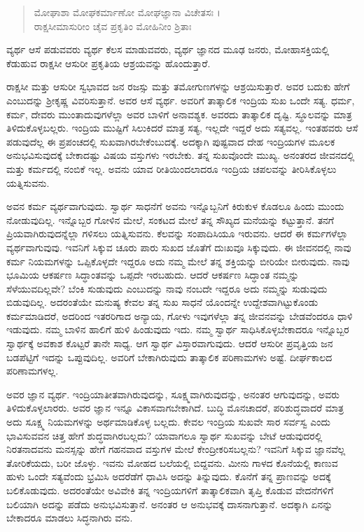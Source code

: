 \begin{verse}
ಮೋಘಾಶಾ ಮೋಘಕರ್ಮಾಣೋ ಮೋಘಜ್ಞಾನಾ ವಿಚೇತಸಃ ।\\ರಾಕ್ಷಸೀಮಾಸುರೀಂ ಚೈವ ಪ್ರಕೃತಿಂ ಮೋಹಿನೀಂ ಶ್ರಿತಾಃ 
\end{verse}

{\small ವ್ಯರ್ಥ ಆಸೆ ಪಡುವವರು ವ್ಯರ್ಥ ಕೆಲಸ ಮಾಡುವವರು, ವ್ಯರ್ಥ ಜ್ಞಾನದ ಮೂಢ ಜನರು, ಮೋಹಾಸಕ್ತಿಯಲ್ಲಿ ಕೆಡುಹುವ ರಾಕ್ಷಸೀ ಆಸುರೀ ಪ್ರಕೃತಿಯ ಆಶ್ರಯವನ್ನು ಹೊಂದುತ್ತಾರೆ.}

ರಾಕ್ಷಸೀ ಮತ್ತು ಆಸುರೀ ಸ್ವಭಾವದ ಜನ ರಜಸ್ಸು ಮತ್ತು ತಮೋಗುಣಗಳನ್ನು ಆಶ್ರಯಿಸುತ್ತಾರೆ. ಅವರ ಬದುಕು ಹೇಗೆ ಎಂಬುದನ್ನು ಶ್ರೀಕೃಷ್ಣ ವಿವರಿಸುತ್ತಾನೆ. ಅವರ ಆಸೆ ವ್ಯರ್ಥ. ಅವರಿಗೆ ತಾತ್ಕಾಲಿಕ ಇಂದ್ರಿಯ ಸುಖ ಒಂದೇ ಸತ್ಯ. ಧರ್ಮ, ಕರ್ಮ, ದೇವರು ಮುಂತಾದುವುಗಳೆಲ್ಲಾ ಅವರ ಬಾಳಿಗೆ ಅನಾವಶ್ಯಕ. ಅವರದು ತಾತ್ಕಾಲಿಕ ದೃಷ್ಟಿ. ಸ್ಥೂಲವನ್ನು ಮಾತ್ರ ತಿಳಿದುಕೊಳ್ಳಬಲ್ಲರು. ಇಂದ್ರಿಯ ಮುಷ್ಟಿಗೆ ಸಿಲುಕಿದರೆ ಮಾತ್ರ ಸತ್ಯ, ಇಲ್ಲದೇ ಇದ್ದರೆ ಅದು ಸತ್ಯವಲ್ಲ. ಇಂತಹವರು ಆಸೆ ಪಡುವುದೆಲ್ಲ ಈ ಪ್ರಪಂಚದಲ್ಲಿ ಸುಖವಾಗಿರಬೇಕೆಂಬುದಕ್ಕೆ. ಅದಕ್ಕಾಗಿ ಪುಷ್ಟವಾದ ದೇಹ ಇಂದ್ರಿಯಗಳ ಮೂಲಕ ಅನುಭವಿಸುವುದಕ್ಕೆ ಬೇಕಾದಷ್ಟು ವಿಷಯ ವಸ್ತುಗಳು ಇರಬೇಕು. ತನ್ನ ಸುಖವೊಂದೇ ಮುಖ್ಯ. ಅನಂತರದ ಜೀವನದಲ್ಲಿ ಮತ್ತು ಕರ್ಮದಲ್ಲಿ ನಂಬಿಕೆ ಇಲ್ಲ. ಅವನು ಯಾವ ರೀತಿಯಿಂದಲಾದರೂ ಇಂದ್ರಿಯ ಚಪಲವನ್ನು ತೀರಿಸಿಕೊಳ್ಳಲು ಯತ್ನಿಸುವನು.

ಅವನ ಕರ್ಮ ವ್ಯರ್ಥವಾಗುವುದು. ಸ್ವಾರ್ಥ ಸಾಧನೆಗೆ ಅವನು ಇನ್ನೊಬ್ಬನಿಗೆ ಕಿರುಕುಳ ಕೊಡಲೂ ಹಿಂದು ಮುಂದು ನೋಡುವುದಿಲ್ಲ. ಇನ್ನೊಬ್ಬರ ಗೋಳಿನ ಮೇಲೆ, ಸಂಕಟದ ಮೇಲೆ ತನ್ನ ಸೌಖ್ಯದ ಮನೆಯನ್ನು ಕಟ್ಟುತ್ತಾನೆ. ತನಗೆ ಪ್ರಿಯವಾಗಿರುವುದನ್ನೆಲ್ಲಾ ಗಳಿಸಲು ಯತ್ನಿಸುವನು. ಕೆಲವನ್ನು ಸಂಪಾದಿಸಿಯೂ ಇರುವನು. ಆದರೆ ಈ ಕರ್ಮಗಳೆಲ್ಲಾ ವ್ಯರ್ಥವಾಗುವುವು. ಇವನಿಗೆ ಸಿಕ್ಕುವ ಚೂರು ಪಾರು ಸುಖದ ಜೊತೆಗೆ ದುಃಖವೂ ಸಿಕ್ಕುವುದು. ಈ ಜೀವನದಲ್ಲಿ ನಾವು ಕರ್ಮ ನಿಯಮಗಳನ್ನು ಒಪ್ಪಿಕೊಳ್ಳದೇ ಇದ್ದರೂ ಅದು ನಮ್ಮ ಮೇಲೆ ತನ್ನ ಶಕ್ತಿಯನ್ನು ಬೀರಿಯೇ ಬೀರುವುದು. ನಾವು ಭೂಮಿಯ ಆಕರ್ಷಣ ಸಿದ್ಧಾಂತವನ್ನು ಒಪ್ಪದೇ ಇರಬಹುದು. ಆದರೆ ಆಕರ್ಷಣ ಸಿದ್ಧಾಂತ ನಮ್ಮನ್ನು ಸೆಳೆಯುವದಿಲ್ಲವೇ? ಬೆಂಕಿ ಸುಡುವುದು ಎಂಬುದನ್ನು ನಾವು ನಂಬದೇ ಇದ್ದರೂ ಅದು ನಮ್ಮನ್ನು ಸುಡುವುದು ಬಿಡುವುದಿಲ್ಲ. ಅದರಂತೆಯೇ ಮನುಷ್ಯ ಕೇವಲ ತನ್ನ ಸುಖ ಸಾಧನೆ ಯೊಂದನ್ನೇ ಉದ್ದೇಶವಾಗಿಟ್ಟುಕೊಂಡು ಕರ್ಮಮಾಡಿದರೆ, ಅದರಿಂದ ಇತರರಿಗಾದ ಅನ್ಯಾಯ, ಗೋಳು ಇವುಗಳೆಲ್ಲಾ ತನ್ನ ಜೀವನವನ್ನು ಬೇಡವೆಂದರೂ ಧಾಳಿ ಇಡುವುದು. ನಮ್ಮ ಬಾಳಿನ ಹಾಲಿಗೆ ಹುಳಿ ಹಿಂಡುವುದು ಇದು. ನಮ್ಮ ಸ್ವಾರ್ಥ ಸಾಧಿಸಿಕೊಳ್ಳಬೇಕಾದರೂ ಇನ್ನೊಬ್ಬರ ಸ್ವಾರ್ಥಕ್ಕೆ ಅವಕಾಶ ಕೊಟ್ಟರೆ ತಾನೇ ಸಾಧ್ಯ. ಆಗ ಸ್ವಾರ್ಥ ವಿಸ್ತಾರವಾಗುವುದು. ಆದರೆ ಆಸುರೀ ಪ್ರವೃತ್ತಿಯ ಜನ ಬಡಪೆಟ್ಟಿಗೆ ಇದನ್ನು ಒಪ್ಪುವುದಿಲ್ಲ. ಅವರಿಗೆ ಬೇಕಾಗಿರುವುದು ತಾತ್ಕಾಲಿಕ ಪರಿಣಾಮಗಳು ಅಷ್ಟೆ. ದೀರ್ಘಕಾಲದ ಪರಿಣಾಮಗಳಲ್ಲ.

ಅವರ ಜ್ಞಾನ ವ್ಯರ್ಥ. ಇಂದ್ರಿಯಾತೀತವಾಗಿರುವುದನ್ನು, ಸೂಕ್ಷ್ಮವಾಗಿರುವುದನ್ನು, ಅನಂತರ ಆಗುವುದನ್ನು, ಅವರು ತಿಳಿದುಕೊಳ್ಳಲಾರರು. ಅವರ ಜ್ಞಾನ ಇನ್ನೂ ವಿಕಾಸವಾಗಬೇಕಾಗಿದೆ. ಬುದ್ಧಿ ಮೊನಚಾದರೆ, ಪರಿಶುದ್ಧವಾದರೆ ಮಾತ್ರ ಅದು ಸೂಕ್ಷ್ಮ ನಿಯಮಗಳನ್ನು ಅರ್ಥಮಾಡಿಕೊಳ್ಳ ಬಲ್ಲದು. ಕೇವಲ ಇಂದ್ರಿಯ ಸುಖವೇ ಸಾರ ಸರ್ವಸ್ವ ಎಂದು ಭಾವಿಸುವವನ ಚಿತ್ತ ಹೇಗೆ ಶುದ್ಧವಾಗಿರಬಲ್ಲದು? ಯಾವಾಗಲೂ ಸ್ವಾರ್ಥ ಸುಖವನ್ನು ಬೇಟೆ ಆಡುವುದರಲ್ಲಿ ನಿರತನಾದವನು ಮನಸ್ಸನ್ನು ಹೇಗೆ ಗಹನವಾದ ವಸ್ತುಗಳ ಮೇಲೆ ಕೇಂದ್ರೀಕರಿಸಬಲ್ಲನು? ಇವನಿಗೆ ಸಿಕ್ಕುವ ಜ್ಞಾನವೆಲ್ಲ ತೋರಿಕೆಯದು, ಬರೀ ಜೊಳ್ಳು. ಇವನು ಮೋಹದ ಬಲೆಯಲ್ಲಿ ಬಿದ್ದವನು. ಮೀನು ಗಾಳದ ಕೊನೆಯಲ್ಲಿ ಕಾಣುವ ಹುಳು ಒಂದೇ ಸತ್ಯವೆಂದು ಭ್ರಮಿಸಿ ಅದರೆಡೆಗೆ ಧಾವಿಸಿ ಅದನ್ನು ತಿನ್ನುವುದು. ಕೊನೆಗೆ ತನ್ನ ಪ್ರಾಣವನ್ನು ಅದಕ್ಕೆ ಬಲಿಕೊಡುವುದು. ಅದರಂತೆಯೇ ಅವಿವೇಕಿ ತನ್ನ ಇಂದ್ರಿಯಗಳಿಗೆ ತಾತ್ಕಾಲಿಕವಾಗಿ ತೃಪ್ತಿ ಕೊಡುವ ವೇದನೆಗಳಿಗೆ ಬಲಿಯಾಗಿ ಅದನ್ನು ಪಡೆದು ಅನುಭವಿಸುತ್ತಾನೆ. ಅನಂತರ ಆ ಅನುಭವಕ್ಕೆ ದಾಸನಾಗುತ್ತಾನೆ. ಅದಕ್ಕಾಗಿ ಏನನ್ನು ಬೇಕಾದರೂ ಮಾಡಲು ಸಿದ್ಧನಾಗಿರು ವನು.

